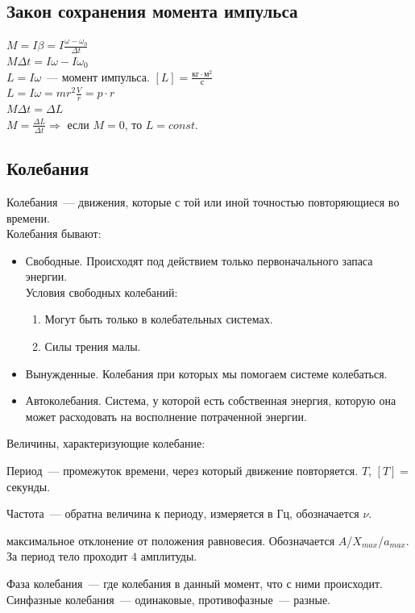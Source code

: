 \documentclass[12pt]{article}
\begin{document}
	\subsection{Закон сохранения момента импульса}
	$M = I \beta = I \frac{\omega - \omega_0}{\varDelta t}$\\
	$M \varDelta t = I \omega - I \omega_0$\\
	$L = I \omega$~--- момент импульса. $[L] = \frac{\text{кг} \cdot \text{м}^2}{\text{с}}$\\
	$L = I \omega = m r^2 \frac{V}{r} = p \cdot r$\\
	$M \varDelta t = \varDelta L$\\
	$M = \frac{\varDelta L}{\varDelta t} \Rightarrow$ если $M = 0$, то $L = const$.
	\subsection{Колебания}
	\begin{definition}
		Колебания~--- движения, которые с той или иной точностью повторяющиеся во времени.\\
		Колебания бывают:
		\begin{itemize}
			\item Свободные. Происходят под действием только первоначального запаса энергии.\\
			Условия свободных колебаний:
			\begin{enumerate}
				\item Могут быть только в колебательных системах.
				\item Силы трения малы.
			\end{enumerate}
			\item Вынужденные. Колебания при которых мы помогаем системе колебаться.
			\item Автоколебания. Система, у которой есть собственная энергия, которую она может расходовать на восполнение потраченной энергии.
		\end{itemize}
	\end{definition}
	\begin{definition}
		Величины, характеризующие колебание:
		\begin{description}
			\begin{definition}
				Период~--- промежуток времени, через который движение повторяется. $T$, $[T] =$ секунды.
			\end{definition}
			\begin{definition}
				Частота~--- обратна величина к периоду, измеряется в Гц, обозначается $\nu$.
			\end{definition}
			\begin{definition}
				максимальное отклонение от положения равновесия. Обозначается $A$/$X_{max}$/$a_{max}$. За период тело проходит $4$ амплитуды.
			\end{definition}
			\begin{definition}
				Фаза колебания~--- где колебания в данный момент, что с ними происходит. Синфазные колебания~--- одинаковые, противофазные~--- разные.
			\end{definition}
		\end{description}
	\end{definition}
\end{document}

